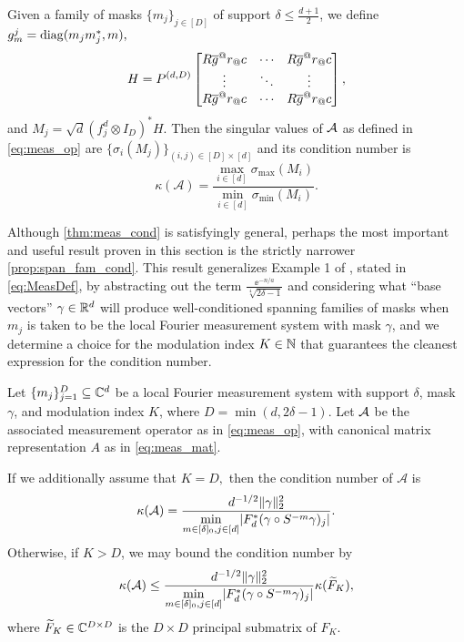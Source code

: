 \begin{theorem}
  Given a family of masks $\{m_j\}_{j \in [D]}$ of support $\delta \le \frac{d + 1}{2}$, we define $g_m^j = \operatorname{diag}(m_j m_j^*, m),$ \[H = P^{(d, D)} \cornmatfun{R \conj{g}^@r_@c}{1}{D}{1 - \delta}{\delta - 1}%
  ,\] and $M_j = \sqrt{d}\left(f_j^d \otimes I_D\right)^* H$.  Then the singular values of $\mathcal{A}$ as defined in \eqref{eq:meas_op} are $\{\sigma_i(M_j)\}_{(i, j) \in [D] \times [d]}$ and its condition number is \[\kappa(\mathcal{A}) = \dfrac{\max\limits_{i \in [d]} \sigma_{\max} (M_i)}{\min\limits_{i \in [d]} \sigma_{\min} (M_i)}.\] \label{prop:meas_cond} \label{thm:meas_cond}
\end{theorem}

Although \cref{thm:meas_cond} is satisfyingly general, perhaps the most important and useful result proven in this section is the strictly narrower \cref{prop:span_fam_cond}.  This result generalizes Example 1 of , stated in \eqref{eq:MeasDef}, by abstracting out the term $\frac{\ee^{-n/a}}{\sqrt[4]{2\delta -1}}$ and considering what ``base vectors'' $\gamma \in \mathbb{R}^d$ will produce well-conditioned spanning families of masks when $m_j$ is taken to be the local Fourier measurement system with mask $\gamma$, and we determine a choice for the modulation index $K \in \mathbb{N}$ that guarantees the cleanest expression for the condition number.  

\begin{proposition}
  Let $\{m_j\}_{j = 1}^D \subseteq \mathbb{C}^d$ be a local Fourier measurement system with support $\delta$, mask $\gamma$, and modulation index $K$, where $D = \min(d, 2 \delta - 1)$.  Let $\mathcal{A}$ be the associated measurement operator as in \eqref{eq:meas_op}, with canonical matrix representation $A$ as in \eqref{eq:meas_mat}.

If we additionally assume that $K = D,$ then the condition number of $\mathcal{A}$ is \begin{equation}\kappa(\mathcal{A}) = \dfrac{d^{-1/2} \lVert\gamma\rVert_2^2}{\min\limits_{m \in [\delta]_0, j \in [d]} \lvert F_d^* (\gamma \circ S^{-m} \gamma)_j \rvert}.\label{eq:clean_cond}\end{equation}  Otherwise, if $K > D$, we may bound the condition number by \begin{equation}\kappa(\mathcal{A}) \le \dfrac{d^{-1/2} \lVert\gamma\rVert_2^2}{\min\limits_{m \in [\delta]_0, j \in [d]} \lvert F_d^* (\gamma \circ S^{-m} \gamma)_j \rvert} \kappa(\widetilde{F}_K), \label{eq:messy_cond}\end{equation} where $\widetilde{F}_K \in \mathbb{C}^{D \times D}$ is the $D \times D$ principal submatrix of $F_K$.
\label{prop:span_fam_cond}
\label{prop:gam_fam_cond}
\end{proposition}

